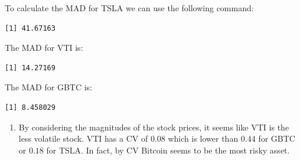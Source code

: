 \documentclass[
  letterpaper,
  DIV=11,
  numbers=noendperiod]{scrreprt}
\newenvironment{Shaded}{\begin{snugshade}}{\end{snugshade}}
\newcommand{\FunctionTok}[1]{\textcolor[rgb]{0.28,0.35,0.67}{#1}}
\newcommand{\NormalTok}[1]{\textcolor[rgb]{0.00,0.23,0.31}{#1}}
\newcommand{\OtherTok}[1]{\textcolor[rgb]{0.00,0.23,0.31}{#1}}
\newcommand{\SpecialCharTok}[1]{\textcolor[rgb]{0.37,0.37,0.37}{#1}}
\providecommand{\tightlist}{%
  \setlength{\itemsep}{0pt}\setlength{\parskip}{0pt}}\usepackage{longtable,booktabs,array}
\begin{document}
To calculate the MAD for TSLA we can use the following command:

\begin{Shaded}
\end{Shaded}

\begin{verbatim}
[1] 41.67163
\end{verbatim}

The MAD for VTI is:

\begin{Shaded}
\end{Shaded}

\begin{verbatim}
[1] 14.27169
\end{verbatim}

The MAD for GBTC is:

\begin{Shaded}
\end{Shaded}

\begin{verbatim}
[1] 8.458029
\end{verbatim}

\begin{enumerate}
\def\labelenumi{\arabic{enumi}.}
\setcounter{enumi}{2}
\tightlist
\item
  By considering the magnitudes of the stock prices, it seems like VTI
  is the less volatile stock. VTI has a CV of \(0.08\) which is lower
  than \(0.44\) for GBTC or \(0.18\) for TSLA. In fact, by CV Bitcoin
  seems to be the most risky asset.
\end{enumerate}
\end{document}
